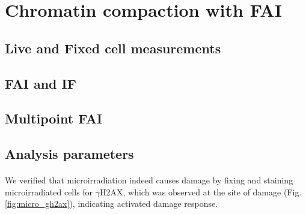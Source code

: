 \section{Chromatin compaction with FAI}
\subsection{Live and Fixed cell measurements}
\subsection{FAI and IF}
\subsection{Multipoint FAI}
\subsection{Analysis parameters}
\paragraph*{} We verified that microirradiation indeed causes damage by fixing and staining microirradiated cells for $\gamma$H2AX, which was observed at the site of damage (Fig. {\ref{fig:micro_gh2ax}}), indicating activated damage response.

